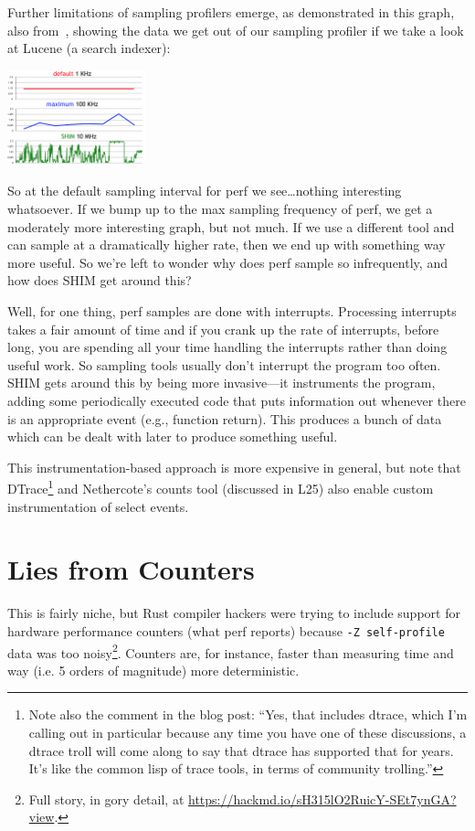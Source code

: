 \documentclass[a4paper]{report}
\begin{document}
Further limitations of sampling profilers emerge, as demonstrated in this graph, also from~\cite{perf-tracing}, showing the data we get out of our sampling profiler if we take a look at Lucene (a search indexer):

\begin{center}
	\includegraphics[width=0.3\textwidth]{images/perf-sample.png}
\end{center}

So at the default sampling interval for perf we see\ldots nothing interesting whatsoever. If we bump up to the max sampling frequency of perf, we get a moderately more interesting graph, but not much. If we use a different tool and can sample at a dramatically higher rate, then we end up with something way more useful. So we're left to wonder why does perf sample so infrequently, and how does SHIM get around this?

Well, for one thing, perf samples are done with interrupts. Processing interrupts takes a fair amount of time and if you crank up the rate of interrupts, before long, you are spending all your time handling the interrupts rather than doing useful work. So sampling tools usually don't interrupt the program too often. SHIM gets around this by being more invasive---it instruments the program, adding some periodically executed code that puts information out whenever there is an appropriate event (e.g., function return). This produces a bunch of data which can be dealt with later to produce something useful.

This instrumentation-based approach is more expensive in general, but note that DTrace\footnote{Note also the comment in the blog post: ``Yes, that includes dtrace, which I'm calling out in particular because any time you have one of these discussions, a dtrace troll will come along to say that dtrace has supported that for years. It's like the common lisp of trace tools, in terms of community trolling.''} and Nethercote's counts tool (discussed in L25) also enable custom instrumentation of select events. 

\section*{Lies from Counters}
This is fairly niche, but Rust compiler hackers were trying to include
support for hardware performance counters (what perf reports) because
{\tt -Z self-profile} data was too noisy\footnote{Full story, in gory
detail,
at \url{https://hackmd.io/sH315lO2RuicY-SEt7ynGA?view}.}. Counters
are, for instance, faster than measuring time and way (i.e. 5 orders of magnitude) more deterministic.
\end{document}
